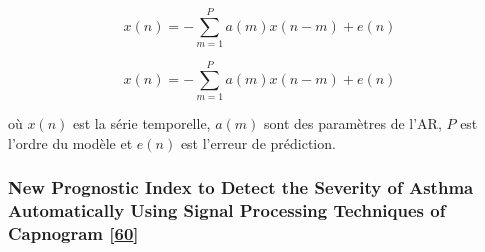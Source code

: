 \documentclass[12pt,]{article}
\begin{document}
\[x(n)=-\sum_{m=1}^{P} a(m)x(n-m)+e(n)\]

\begin{equation}
    x(n)=-\sum_{m=1}^{P} a(m)x(n-m)+e(n)
\label{autoregresive model}
\end{equation}

où \(x(n)\) est la série temporelle, \(a(m)\) sont des paramètres de
l'AR, \(P\) est l'ordre du modèle et \(e(n)\) est l'erreur de
prédiction.

\hypertarget{new-prognostic-index-to-detect-the-severity-of-asthma-automatically-using-signal-processing-techniques-of-capnogram-kazemi2016new}{%
\subsubsection{\texorpdfstring{New Prognostic Index to Detect the
Severity of Asthma Automatically Using Signal Processing Techniques of
Capnogram
{[}\protect\hyperlink{ref-kazemi2016new}{60}{]}}{New Prognostic Index to Detect the Severity of Asthma Automatically Using Signal Processing Techniques of Capnogram {[}60{]}}}\label{new-prognostic-index-to-detect-the-severity-of-asthma-automatically-using-signal-processing-techniques-of-capnogram-kazemi2016new}}
\end{document}
